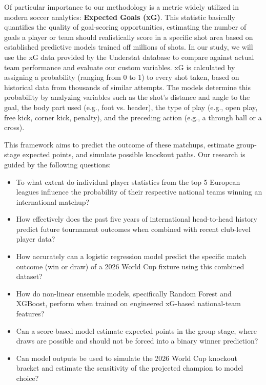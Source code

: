 \documentclass[11pt]{article}
\begin{document}
Of particular importance to our methodology is a metric widely utilized in modern soccer analytics: \textbf{Expected Goals (xG)}. This statistic basically quantifies the quality of goal-scoring opportunities, estimating the number of goals a player or team should realistically score in a specific shot area based on established predictive models trained off millions of shots. In our study, we will use the xG data provided by the Understat database to compare against actual team performance and evaluate our custom variables. xG is calculated by assigning a probability (ranging from 0 to 1) to every shot taken, based on historical data from thousands of similar attempts. The models determine this probability by analyzing variables such as the shot's distance and angle to the goal, the body part used (e.g., foot vs. header), the type of play (e.g., open play, free kick, corner kick, penalty), and the preceding action (e.g., a through ball or a cross).

This framework aims to predict the outcome of these matchups, estimate group-stage expected points, and simulate possible knockout paths. Our research is guided by the following questions:
\begin{itemize}
\item To what extent do individual player statistics from the top 5 European leagues influence the probability of their respective national teams winning an international matchup?

\item How effectively does the past five years of international head-to-head history predict future tournament outcomes when combined with recent club-level player data?

\item How accurately can a logistic regression model predict the specific match outcome (win or draw) of a 2026 World Cup fixture using this combined dataset?

\item How do non-linear ensemble models, specifically Random Forest and XGBoost, perform when trained on engineered xG-based national-team features?

\item Can a score-based model estimate expected points in the group stage, where draws are possible and should not be forced into a binary winner prediction?

\item Can model outputs be used to simulate the 2026 World Cup knockout bracket and estimate the sensitivity of the projected champion to model choice?

\end{itemize}
\end{document}

